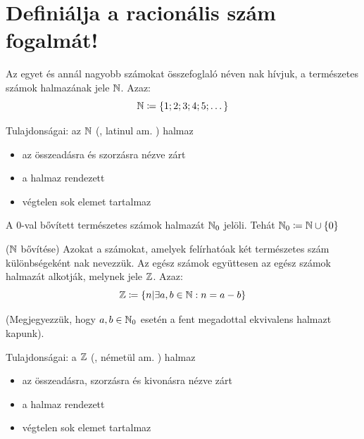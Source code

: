 
\section{Definiálja a racionális szám fogalmát!}
\label{009}

\begin{defin}
Az egyet és annál nagyobb számokat összefoglaló néven nak hívjuk, a természetes számok halmazának jele $\mathbb{N}$. Azaz:
\[
  \mathbb{N} \coloneqq \{1; 2; 3; 4; 5; \dots{ }\}
\]

Tulajdonságai: az $\mathbb{N}$ (, latinul am.
) halmaz
\begin{itemize}
\item az összeadásra és szorzásra nézve zárt
\item a halmaz rendezett
\item végtelen sok elemet tartalmaz
\end{itemize}

A $0$-val bővített természetes számok halmazát $\mathbb{N}_0$ jelöli. Tehát
$\mathbb{N}_0 \coloneqq \mathbb{N} \cup \{0\}$
\end{defin}

\begin{defin} ($\mathbb{N}$ bővítése)
Azokat a számokat, amelyek felírhatóak két természetes szám különbségeként
nak nevezzük. Az egész számok együttesen az egész
számok halmazát alkotják, melynek jele $\mathbb{Z}$. Azaz:
\[
  \mathbb{Z} \coloneqq \{n | \exists a, b \in \mathbb{N}:  n = a - b\}
\]

(Megjegyezzük, hogy $a, b \in \mathbb{N}_0$ esetén a fent megadottal ekvivalens
halmazt kapunk).

Tulajdonságai: a $\mathbb{Z}$ (, németül am.
) halmaz
\begin{itemize}
\item az összeadásra, szorzásra és kivonásra nézve zárt
\item a halmaz rendezett
\item végtelen sok elemet tartalmaz
\end{itemize}
\end{defin}

